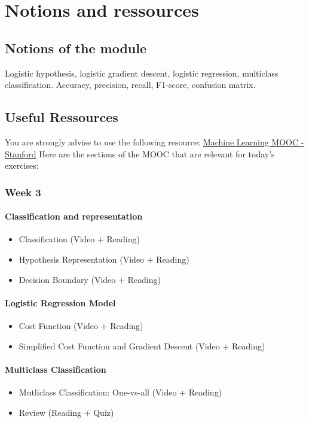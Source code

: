 

\chapter*{Notions and ressources}

\section*{Notions of the module}
Logistic hypothesis, logistic gradient descent, logistic regression, multiclass classification. 
Accuracy, precision, recall, F1-score, confusion matrix.

\section*{Useful Ressources}

You are strongly advise to use the following resource:
\href{https://www.coursera.org/learn/machine-learning/home/week/3}{Machine Learning MOOC - Stanford}
Here are the sections of the MOOC that are relevant for today's exercises: 

\subsection*{Week 3}

\subsubsection*{Classification and representation}
\begin{itemize}
  \item Classification (Video + Reading)
  \item Hypothesis Representation (Video + Reading)
  \item Decision Boundary (Video + Reading)
\end{itemize}

\subsubsection*{Logistic Regression Model}
\begin{itemize}
  \item Cost Function (Video + Reading)
  \item Simplified Cost Function and Gradient Descent (Video + Reading)
\end{itemize}

\subsubsection*{Multiclass Classification}
\begin{itemize}
  \item Mutliclass Classification: One-vs-all (Video + Reading)
  \item Review (Reading + Quiz)
\end{itemize}
